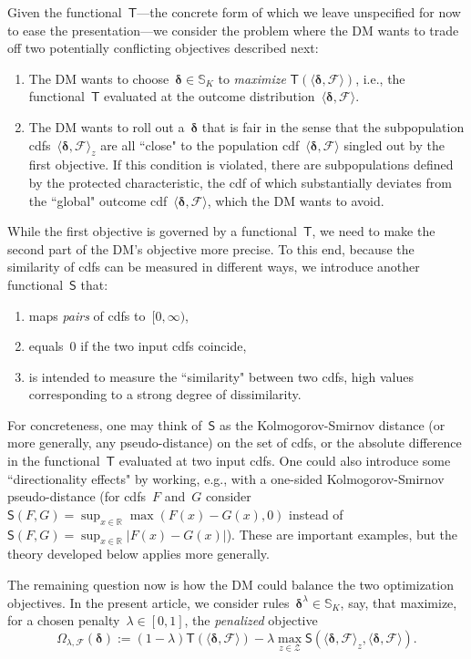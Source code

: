 \documentclass[11pt, a4paper]{article}
\newcommand{\R}{\mathbb{R}}
\theoremstyle{definition}
\begin{document}
Given the functional~$\mathsf{T}$---the concrete form of which we leave unspecified for now to ease the presentation---we consider the problem where the DM wants to trade off two potentially conflicting objectives described next:
%
\begin{enumerate}
\item The DM wants to choose~$\bm{\delta} \in \mathbb{S}_K$ to \emph{maximize} $\mathsf{T}(\langle \bm{\delta}, \mathcal{F} \rangle)$, i.e., the functional~$\mathsf{T}$ evaluated at the outcome distribution~$\langle \bm{\delta}, \mathcal{F} \rangle$. 
\item The DM wants to roll out a~$\bm{\delta}$ that is fair in the sense that the subpopulation cdfs~$\langle \bm{\delta}, \mathcal{F} \rangle_z$ are all ``close" to the population cdf~$\langle\bm{\delta}, \mathcal{F} \rangle$ singled out by the first objective. If this condition is violated, there are subpopulations defined by the protected characteristic, the cdf of which substantially deviates from the ``global" outcome cdf~$\langle \bm{\delta}, \mathcal{F} \rangle$, which the DM wants to avoid.
\end{enumerate}
%
While the first objective is governed by a functional~$\mathsf{T}$, we need to make the second part of the DM's objective more precise. To this end, because the similarity of cdfs can be measured in different ways, we introduce another functional~$\mathsf{S}$ that: 
\begin{enumerate}[label=(\alph*)]
\item maps \emph{pairs} of cdfs to~$[0, \infty)$,
\item equals~$0$ if the two input cdfs coincide,
\item is intended to measure the ``similarity" between two cdfs, high values corresponding to a strong degree of dissimilarity.
\end{enumerate}  
%
For concreteness, one may think of~$\mathsf{S}$ as the Kolmogorov-Smirnov distance (or more generally, any pseudo-distance) on the set of cdfs, or the absolute difference in the functional~$\mathsf{T}$ evaluated at two input cdfs. One could also introduce some ``directionality effects" by working, e.g., with a one-sided Kolmogorov-Smirnov pseudo-distance (for cdfs~$F$ and~$G$ consider~$\mathsf{S}(F, G) = \sup_{x \in \R} \max(F(x) - G(x), 0)$ instead of~$\mathsf{S}(F, G) = \sup_{x \in \R} |F(x) - G(x)|$). These are important examples, but the theory developed below applies more generally.

The remaining question now is how the DM could balance the two optimization objectives. In the present article, we consider rules~$\bm{\delta}^{\lambda} \in \mathbb{S}_K$, say, that maximize, for a chosen penalty~$\lambda \in [0, 1]$, the \emph{penalized} objective
%
\begin{equation}\label{eqn:omegadef}
\Omega_{\lambda, \mathcal{F}}(\bm{\delta}) := (1-\lambda) \mathsf{T}\left( \langle \bm{\delta}, \mathcal{F} \rangle \right) - \lambda \max_{z \in \mathcal{Z}} \mathsf{S} \left(\langle \bm{\delta}, \mathcal{F} \rangle_z , \langle \bm{\delta}, \mathcal{F} \rangle \right).
\end{equation} 
\end{document}

